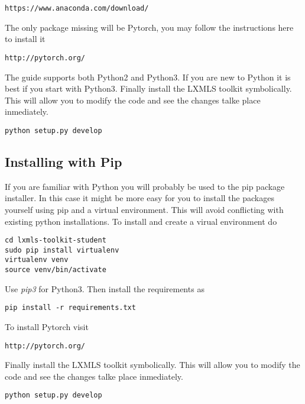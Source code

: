 \begin{verbatim}
https://www.anaconda.com/download/
\end{verbatim}

\noindent The only package missing will be Pytorch, you may follow the instructions here to install it

\begin{verbatim}
http://pytorch.org/
\end{verbatim}

\noindent The guide supports both Python2 and Python3. If you are new to Python it is best if you start with Python3. Finally install the LXMLS toolkit symbolically. This will allow you to modify the code and see the changes talke place inmediately.

\begin{verbatim}
python setup.py develop
\end{verbatim}

\subsection{Installing with Pip}

If you are familiar with Python you will probably be used to the pip package installer. In this case it might be more easy for you to install the packages yourself using pip and a virtual environment. This will avoid conflicting with existing python installations. To install and create a virual environment do

\begin{verbatim}
cd lxmls-toolkit-student
sudo pip install virtualenv
virtualenv venv 
source venv/bin/activate
\end{verbatim}

\noindent Use \textit{pip3} for Python3. Then install the requirements as

\begin{verbatim}
pip install -r requirements.txt 
\end{verbatim}

\noindent To install Pytorch visit 

\begin{verbatim}
http://pytorch.org/
\end{verbatim}

Finally install the LXMLS toolkit symbolically. This will allow you to modify the code and see the changes talke place inmediately.

\begin{verbatim}
python setup.py develop
\end{verbatim}

